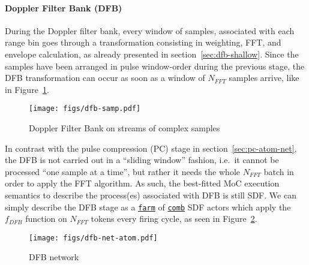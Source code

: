 \documentclass[
  a4paper,
]{article}
\let\oldparagraph\paragraph
\renewcommand{\paragraph}[1]{\oldparagraph{#1}\mbox{}}
\begin{document}
\hypertarget{sec:dfb-atom-net}{%
\paragraph{Doppler Filter Bank (DFB)}\label{sec:dfb-atom-net}}

During the Doppler filter bank, every window of samples, associated with
each range bin goes through a transformation consisting in weighting,
FFT, and envelope calculation, as already presented in
section~\ref{sec:dfb-shallow}. Since the samples have been arranged in
pulse window-order during the previous stage, the DFB transformation can
occur as soon as a window of \(N_{FFT}\) samples arrive, like in
Figure~\ref{fig:dfb-samp}.

\begin{figure}
\hypertarget{fig:dfb-samp}{%
\centering
\texttt{[image: figs/dfb-samp.pdf]}
\caption{Doppler Filter Bank on streams of complex
samples}\label{fig:dfb-samp}
}
\end{figure}

In contrast with the pulse compression (PC) stage in
section~\ref{sec:pc-atom-net}, the DFB is not carried out in a ``sliding
window'' fashion, i.e.~it cannot be processed ``one sample at a time'',
but rather it needs the whole \(N_{FFT}\) batch in order to apply the
FFT algorithm. As such, the best-fitted MoC execution semantics to
describe the process(es) associated with DFB is still SDF. We can simply
describe the DFB stage as a
\href{https://forsyde.github.io/forsyde-atom/api/ForSyDe-Atom-Skeleton-Vector.html\#v:farm22}{\texttt{farm}}
of
\href{https://forsyde.github.io/forsyde-atom/api/ForSyDe-Atom-MoC-SDF.html\#v:comb22}{\texttt{comb}}
SDF actors which apply the \(f_{DFB}\) function on \(N_{FFT}\) tokens
every firing cycle, as seen in Figure~\ref{fig:dfb-net-atom}.

\begin{figure}
\hypertarget{fig:dfb-net-atom}{%
\centering
\texttt{[image: figs/dfb-net-atom.pdf]}
\caption{DFB network}\label{fig:dfb-net-atom}
}
\end{figure}
\end{document}
